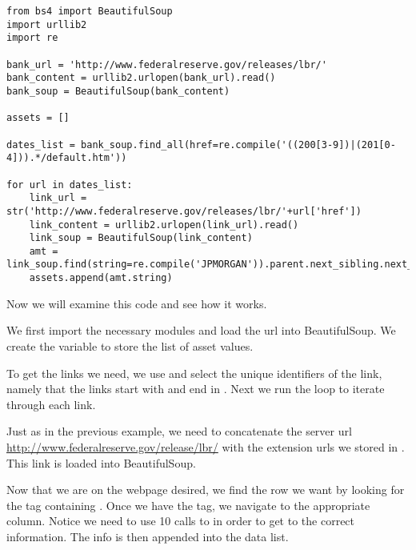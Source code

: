 \begin{lstlisting}
from bs4 import BeautifulSoup
import urllib2
import re

bank_url = 'http://www.federalreserve.gov/releases/lbr/'
bank_content = urllib2.urlopen(bank_url).read()
bank_soup = BeautifulSoup(bank_content)

assets = []

dates_list = bank_soup.find_all(href=re.compile('((200[3-9])|(201[0-4])).*/default.htm'))

for url in dates_list:
    link_url = str('http://www.federalreserve.gov/releases/lbr/'+url['href'])
    link_content = urllib2.urlopen(link_url).read()
    link_soup = BeautifulSoup(link_content)
    amt = link_soup.find(string=re.compile('JPMORGAN')).parent.next_sibling.next_sibling.next_sibling.next_sibling.next_sibling.next_sibling.next_sibling.next_sibling.next_sibling.next_sibling
    assets.append(amt.string)
\end{lstlisting}
Now we will examine this code and see how it works.

We first import the necessary modules and load the url into BeautifulSoup.
We create the variable  to store the list of asset values.

To get the links we need, we use  and select the unique identifiers of the link, namely that the links start with  and end in .
Next we run the  loop to iterate through each link.

Just as in the previous example, we need to concatenate the server url \url{http://www.federalreserve.gov/release/lbr/} with the extension urls we stored in .
This link is loaded into BeautifulSoup.

Now that we are on the webpage desired, we find the row we want by looking for the tag containing . Once we have the tag, we navigate to the appropriate column.
Notice we need to use 10 calls to  in order to get to the correct information.
The info is then appended into the data list.

